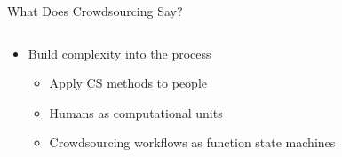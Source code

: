 \documentclass[presentation]{subfiles}
\begin{document}
\begin{frame}{What Does Crowdsourcing Say?}
\begin{columns}
  \begin{column}{0.6\textwidth}
    \begin{itemize}
      \item Build complexity into the process
      \begin{itemize}
        \item<1> Apply CS methods to people\\
        \scriptsize{\textcite{crowdForgeKittur}}\normalsize{}
        \item<2> Humans as computational units\\
        \scriptsize{\textcite{Lasecki:2014:LSR:2661334.2661352}}\normalsize{}
        \item<3> Crowdsourcing workflows as function state machines\\
        \scriptsize{\textcite{latoza2014microtask}
        }
      \end{itemize}
    \end{itemize}
  \end{column}
  
  \begin{column}{0.4\textwidth}
    \begin{figure}
    

\end{figure}
\end{column}
\end{columns}
\end{frame}
\end{document}
